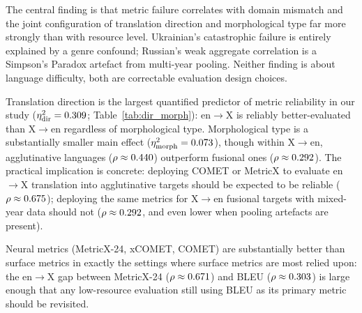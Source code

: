 \documentclass[11pt]{article}
\begin{document}
The central finding is that metric failure correlates with domain mismatch and the joint configuration of translation direction and morphological type far more strongly than with resource level. Ukrainian's catastrophic failure is entirely explained by a genre confound; Russian's weak aggregate correlation is a Simpson's Paradox artefact from multi-year pooling. Neither finding is about language difficulty, both are correctable evaluation design choices.

Translation direction is the largest quantified predictor of metric reliability in our study ($\eta^2_{\text{dir}}=0.309$; Table~\ref{tab:dir_morph}): en$\to$X is reliably better-evaluated than X$\to$en regardless of morphological type. Morphological type is a substantially smaller main effect ($\eta^2_{\text{morph}}=0.073$), though within X$\to$en, agglutinative languages ($\rho\approx0.440$) outperform fusional ones ($\rho\approx0.292$). The practical implication is concrete: deploying COMET or MetricX to evaluate en$\to$X translation into agglutinative targets should be expected to be reliable ($\rho\approx0.675$); deploying the same metrics for X$\to$en fusional targets with mixed-year data should not ($\rho\approx0.292$, and even lower when pooling artefacts are present).

Neural metrics (MetricX-24, xCOMET, COMET) are substantially better than surface metrics in exactly the settings where surface metrics are most relied upon: the en$\to$X gap between MetricX-24 ($\rho\approx0.671$) and BLEU ($\rho\approx0.303$) is large enough that any low-resource evaluation still using BLEU as its primary metric should be revisited.
\end{document}
